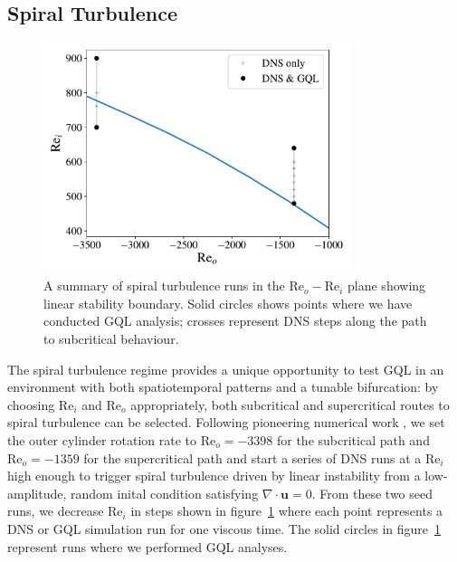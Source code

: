 \documentclass[openacc]{rstransa}%
\newcommand{\Reyn}{\mathrm{Re}}
\begin{document}
\subsection{Spiral Turbulence}
\begin{figure}
    \centering
    \includegraphics[width=0.8\textwidth]{../figs/reo_rei_lsb.pdf}
    \caption{A summary of spiral turbulence runs in the $\Reyn_o-\Reyn_i$ plane showing linear stability boundary. Solid circles shows points where we have conducted GQL analysis; crosses represent DNS steps along the path to subcritical behaviour. }
    \label{fig:LSB}
\end{figure}

The spiral turbulence regime provides a unique opportunity to test GQL in an environment with both spatiotemporal patterns and a tunable bifurcation: by choosing $\Reyn_i$ and $\Reyn_o$ appropriately, both subcritical and supercritical routes to spiral turbulence can be selected.
Following pioneering numerical work \cite{2009PhRvE..79c6309M, 2009PhRvE..80d6315M}, we set the outer cylinder rotation rate to $\Reyn_o = -3398$ for the subcritical path and $\Reyn_o = -1359$ for the supercritical path and start a series of DNS runs at a $\Reyn_i$ high enough to trigger spiral turbulence driven by linear instability from a low-amplitude, random inital condition satisfying $\nabla \cdot \mathbf{u} = 0$.
From these two seed runs, we decrease $\Reyn_i$ in steps shown in figure~\ref{fig:LSB} where each point represents a DNS or GQL simulation run for one viscous time. The solid circles in figure~\ref{fig:LSB} represent runs where we performed GQL analyses. 
\end{document}
